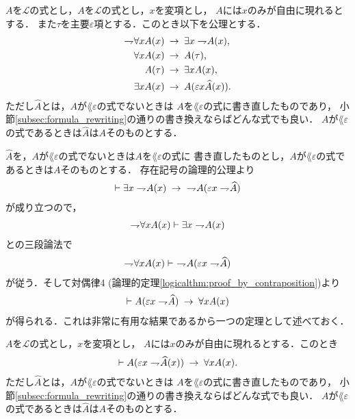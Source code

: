 	\begin{screen}
		\begin{logicalaxm}[量化記号に関する公理]
		\label{logicalaxm:rules_of_quantifiers}
			$A$を$\mathcal{L}$の式とし，$A$を$\mathcal{L}$の式とし，$x$を変項とし，
			$A$には$x$のみが自由に現れるとする．
			また$\tau$を主要$\varepsilon$項とする．このとき以下を公理とする．
			\begin{align}
				\rightharpoondown\hspace{-0.25em} \forall x A(x) &\hspace{0.25em}\rightarrow\hspace{0.25em} \exists x \rightharpoondown\hspace{-0.25em} A(x), \\
				\forall x A(x) &\hspace{0.25em}\rightarrow\hspace{0.25em} A(\tau), \\
				A(\tau) &\hspace{0.25em}\rightarrow\hspace{0.25em} \exists x A(x), \\
				\exists x A(x) &\hspace{0.25em}\rightarrow\hspace{0.25em} A(\varepsilon x \widehat{A}(x)).
			\end{align}
			ただし$\widehat{A}$とは，$A$が$\lang{\varepsilon}$の式でないときは
			$A$を$\lang{\varepsilon}$の式に書き直したものであり，
			小節\ref{subsec:formula_rewriting}の通りの書き換えならばどんな式でも良い．
			$A$が$\lang{\varepsilon}$の式であるときは$\widehat{A}$は$A$そのものとする．
		\end{logicalaxm}
	\end{screen}
	
	$\widehat{A}$を，$A$が$\lang{\varepsilon}$の式でないときは$A$を$\lang{\varepsilon}$の式に
	書き直したものとし，$A$が$\lang{\varepsilon}$の式であるときは$A$そのものとする．
	存在記号の論理的公理より
	\begin{align}
		\vdash \exists x \rightharpoondown\hspace{-0.25em} A(x) \hspace{0.25em}\rightarrow\hspace{0.25em}\ \rightharpoondown\hspace{-0.25em} A(\varepsilon x \rightharpoondown\hspace{-0.25em} \widehat{A})
	\end{align}
	が成り立つので，
	\begin{align}
		\rightharpoondown\hspace{-0.25em} \forall x A(x) \vdash \exists x \rightharpoondown\hspace{-0.25em} A(x)
	\end{align}
	との三段論法で
	\begin{align}
		\rightharpoondown\hspace{-0.25em} \forall x A(x) \vdash\ \rightharpoondown\hspace{-0.25em} A(\varepsilon x \rightharpoondown\hspace{-0.25em} \widehat{A})
	\end{align}
	が従う．そして対偶律4 (論理的定理\ref{logicalthm:proof_by_contraposition})より
	\begin{align}
		\vdash A(\varepsilon x \rightharpoondown\hspace{-0.25em} \widehat{A}) \hspace{0.25em}\rightarrow\hspace{0.25em} \forall x A(x)
	\end{align}
	が得られる．これは非常に有用な結果であるから一つの定理として述べておく．
	
	\begin{screen}
		\begin{logicalthm}
		\label{logicalthm:derivation_of_universal_by_epsilon}
			$A$を$\mathcal{L}$の式とし，$x$を変項とし，
			$A$には$x$のみが自由に現れるとする．このとき
			\begin{align}
				\vdash A(\varepsilon x \rightharpoondown\hspace{-0.25em} \widehat{A}(x)) \hspace{0.25em}\rightarrow\hspace{0.25em} \forall x A(x).
			\end{align}
			ただし$\widehat{A}$とは，$A$が$\lang{\varepsilon}$の式でないときは
			$A$を$\lang{\varepsilon}$の式に書き直したものであり，
			小節\ref{subsec:formula_rewriting}の通りの書き換えならばどんな式でも良い．
			$A$が$\lang{\varepsilon}$の式であるときは$\widehat{A}$は$A$そのものとする．
		\end{logicalthm}
	\end{screen}
	
